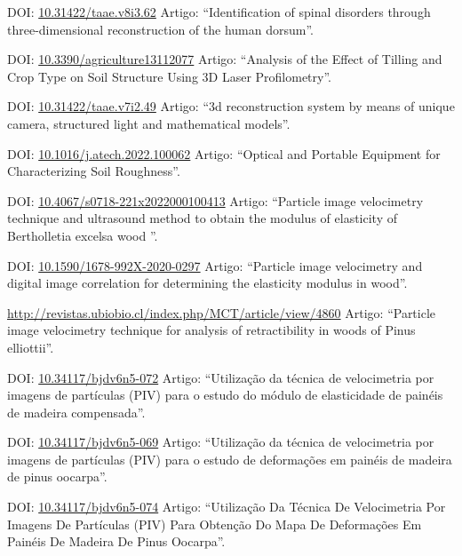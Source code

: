 \documentclass[11pt,a4paper,sans]{moderncv} %
\newcommand{\doiurl}[1]{\href{https://doi.org/#1}{#1}}
\begin{document}
	      {DOI: \doiurl{10.31422/taae.v8i3.62} }{}{}
	      {Artigo: ``Identification of spinal disorders through three-dimensional reconstruction of the human dorsum''.}
	      

	      
	      {DOI: \doiurl{10.3390/agriculture13112077} }{}{}
	      {Artigo: ``Analysis of the Effect of Tilling and Crop Type on Soil Structure Using 3D Laser Profilometry''.}
	      
	      {DOI: \doiurl{10.31422/taae.v7i2.49} }{}{}
	      {Artigo: ``3d reconstruction system by means of unique camera, structured light and mathematical models''.}

	      {DOI: \doiurl{10.1016/j.atech.2022.100062} }{}{}
	      {Artigo: ``Optical and Portable Equipment for Characterizing Soil Roughness''.}
	      
	      {DOI: \doiurl{10.4067/s0718-221x2022000100413} }{}{}
	      {Artigo: ``Particle image velocimetry technique and ultrasound method to obtain the modulus of elasticity of Bertholletia excelsa wood ''.}
	      
	      {DOI: \doiurl{10.1590/1678-992X-2020-0297} }{}{}
	      {Artigo: ``Particle image velocimetry and digital image correlation for determining the elasticity modulus in wood''.}
	      
	      {\url{http://revistas.ubiobio.cl/index.php/MCT/article/view/4860}}{}{}
	      {Artigo: ``Particle image velocimetry technique for analysis of retractibility in woods of Pinus elliottii''.}
	      
	      {DOI: \doiurl{10.34117/bjdv6n5-072}}{}{}
	      {Artigo: ``Utilização da técnica de velocimetria por imagens de partículas (PIV) para o estudo do módulo de elasticidade de painéis de madeira compensada''.}

	      {DOI: \doiurl{10.34117/bjdv6n5-069}}{}{}
	      {Artigo: ``Utilização da técnica de velocimetria por imagens de partículas (PIV) para o estudo de deformações em painéis de madeira de pinus oocarpa''.}


	      {DOI: \doiurl{10.34117/bjdv6n5-074}}{}{}
	      {Artigo: ``Utilização Da Técnica De Velocimetria Por Imagens De Partículas (PIV) Para Obtenção Do Mapa De Deformações Em Painéis De Madeira De Pinus Oocarpa''.}
\end{document}
